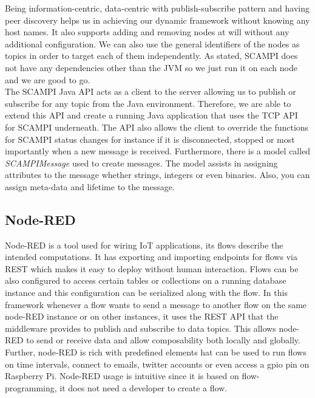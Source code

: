 \noindent Being information-centric, data-centric with publish-subscribe pattern and having peer discovery helps us in achieving our dynamic framework without knowing any host names. It  also supports adding and removing nodes at will without any additional configuration. We can also use the general identifiers of the nodes as topics in order to target each of them independently. As stated, SCAMPI does not have any dependencies other than the JVM so we just run it on each node and we are  good to go. \\


\noindent The SCAMPI Java API acts as a client to the server allowing us to publish or subscribe for any topic from the Java environment. Therefore, we are able to extend this API and create a running Java application that uses the TCP API for SCAMPI underneath. The API also allows the client to override the functions for SCAMPI status changes  for instance if it is disconnected, stopped or most importantly when a new message is received. Furthermore, there is a model called \textit{SCAMPIMessage} used to create messages. The model assists in assigning attributes to the message whether strings, integers or even binaries. Also, you can assign meta-data and lifetime to the message.


\subsection{Node-RED}

Node-RED is a tool used for wiring IoT applications, its flows describe the intended computations. It has exporting and importing endpoints for flows via REST which makes it easy to deploy without human interaction.  Flows can be also configured to access certain tables or collections on a running database instance and this configuration can be serialized along with the flow. In this framework whenever a flow wants to send a message to another flow on the same node-RED instance or on other instances, it uses the REST API that the middleware provides to publish and subscribe to data topics. This allows node-RED to send or receive data and allow composability both locally and globally.  Further, node-RED is rich with predefined elements hat  can be used to run flows on time intervals, connect to emails, twitter accounts or even access a gpio pin on Raspberry Pi. Node-RED usage is intuitive since it is based on flow-programming, it does not need a developer to create a flow.

